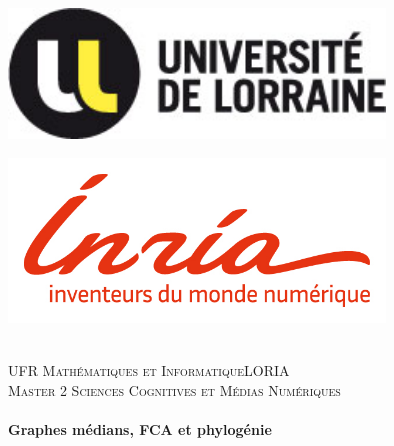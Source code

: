 \begin{titlepage}
\begin{center}

\begin{minipage}{0.4\textwidth}
\begin{flushleft}
\includegraphics[width=0.75\textwidth]{title/logo_UL}~\\[1cm]
\end{flushleft}
\end{minipage}
\begin{minipage}{0.4\textwidth}
\begin{flushright}
\includegraphics[width=0.75\textwidth]{title/logo_inria}~\\[1cm]
\end{flushright}
\end{minipage}

\textsc{\Large }\\[3cm]

\textsc{\LARGE UFR Mathématiques et Informatique\bigbreak LORIA}\\[1.5cm]
\textsc{\LARGE Master 2 Sciences Cognitives et Médias Numériques}\\[1.5cm]

\HRule \\[0.4cm]

{\huge \bfseries Graphes médians, FCA et phylogénie\\[0.4cm] }

\HRule \\[1.5cm]


\end{center}
\end{titlepage}
